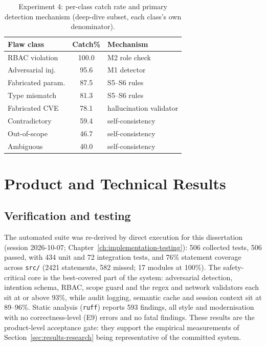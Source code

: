 \begin{table}[h]
\centering
\small
\caption{Experiment 4: per-class catch rate and primary detection mechanism
(deep-dive subset, each class's own denominator).}\label{tab:perclass}
\begin{tabular}{@{}lcl@{}}
\toprule
Flaw class & Catch\% & Mechanism\\
\midrule
RBAC violation   & 100.0 & M2 role check\\
Adversarial inj. & 95.6  & M1 detector\\
Fabricated param.& 87.5  & S5--S6 rules\\
Type mismatch    & 81.3  & S5--S6 rules\\
Fabricated CVE   & 78.1  & hallucination validator\\
Contradictory    & 59.4  & self-consistency\\
Out-of-scope     & 46.7  & self-consistency\\
Ambiguous        & 40.0  & self-consistency\\
\bottomrule
\end{tabular}
\end{table}

\section{Product and Technical Results}\label{sec:product-results}

\subsection{Verification and testing}

The automated suite was re-derived by direct execution for this dissertation
(session 2026-10-07; Chapter~\ref{ch:implementation-testing}): 506 collected
tests, 506 passed, with 434 unit and 72 integration tests, and 76\% statement
coverage across \texttt{src/} (2421 statements, 582 missed; 17 modules at
100\%). The safety-critical core is the best-covered part of the system:
adversarial detection, intention schema, RBAC, scope guard and the regex and
network validators each sit at or above 93\%, while audit logging, semantic
cache and session context sit at 89--96\%. Static analysis
(\texttt{ruff}) reports 593 findings, all style and modernisation with no
correctness-level (E9) errors and no fatal findings. These results are the
product-level acceptance gate: they support the empirical measurements of
Section~\ref{sec:results-research} being representative of the committed system.

